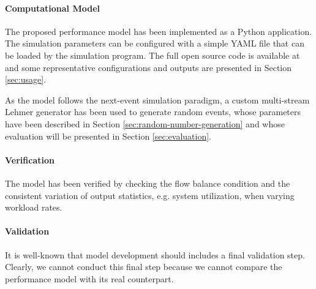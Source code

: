 \paragraph{Computational Model}
The proposed performance model has been implemented as a Python application. 
The simulation parameters can be configured with a simple YAML file that can be loaded by the simulation program.
The full open source code is available at \cite{gmarciani-demule} and some representative configurations and outputs are presented in Section \ref{sec:usage}.

As the model follows the next-event simulation paradigm, a custom multi-stream Lehmer generator has been used to generate random events, whose parameters have been described in Section \ref{sec:random-number-generation} and whose evaluation will be presented in Section \ref{sec:evaluation}.


\paragraph{Verification}
The model has been verified by checking the flow balance condition and the consistent variation of output statistics, e.g. system utilization, when varying workload rates.

\paragraph{Validation}
It is well-known that model development should includes a final validation step. Clearly, we cannot conduct this final step because we cannot compare the performance model with its real counterpart.